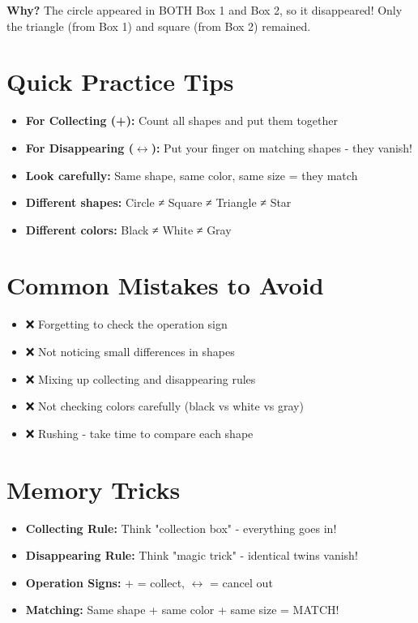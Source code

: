 \documentclass[a4paper,11pt]{article}
\begin{document}
\textbf{Why?} The circle appeared in BOTH Box 1 and Box 2, so it disappeared! Only the triangle (from Box 1) and square (from Box 2) remained.

\section{Quick Practice Tips}

\begin{itemize}
    \item \textbf{For Collecting (+):} Count all shapes and put them together
    \item \textbf{For Disappearing ($\leftrightarrow$):} Put your finger on matching shapes - they vanish!
    \item \textbf{Look carefully:} Same shape, same color, same size = they match
    \item \textbf{Different shapes:} Circle ≠ Square ≠ Triangle ≠ Star
    \item \textbf{Different colors:} Black ≠ White ≠ Gray
\end{itemize}

\section{Common Mistakes to Avoid}

\begin{tcolorbox}[colback=yellow!10!white,colframe=orange!50!black,title=\textbf{Watch Out!}]
\begin{itemize}
    \item ❌ Forgetting to check the operation sign
    \item ❌ Not noticing small differences in shapes
    \item ❌ Mixing up collecting and disappearing rules
    \item ❌ Not checking colors carefully (black vs white vs gray)
    \item ❌ Rushing - take time to compare each shape
\end{itemize}
\end{tcolorbox}

\section{Memory Tricks}

\begin{itemize}
    \item \textbf{Collecting Rule:} Think "collection box" - everything goes in!
    \item \textbf{Disappearing Rule:} Think "magic trick" - identical twins vanish!
    \item \textbf{Operation Signs:} + = collect, $\leftrightarrow$ = cancel out
    \item \textbf{Matching:} Same shape + same color + same size = MATCH!
\end{itemize}
\end{document}
